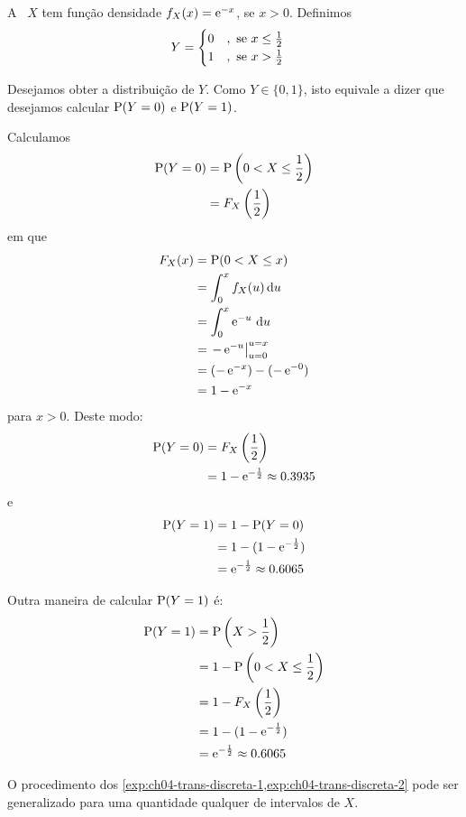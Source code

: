\begin{example}\label{exp:ch04-trans-discreta-2}
    A \va\ $X$ tem função densidade $f_X(x) = \operatorname{e}^{-x}$, se $x > 0$.
    Definimos
    \begin{align*}
        Y &= \begin{cases}
            0 &,\ \text{se } x \le {\textstyle\frac{1}{2}} \\
            1 &,\ \text{se } x > {\textstyle\frac{1}{2}}
        \end{cases}
    \end{align*}

     Desejamos obter a distribuição de $Y$. Como $Y \in \{0, 1\}$,
     isto equivale a dizer que desejamos calcular $\operatorname{P}(Y = 0)$
     e $\operatorname{P}(Y = 1)$.

     Calculamos
    \begin{align*}
        \operatorname{P}(Y = 0) &= \operatorname{P}\left(0 < X \le \frac{1}{2}\right) \\
        &= F_X\left(\frac{1}{2}\right)
    \end{align*}
    em que
    \begin{align*}
        F_X(x) &= \operatorname{P}(0 < X \le x) \\
        &= \int_0^{x} f_X(u)\,\mathrm{d} u \\
        &= \int_0^{x} \operatorname{e}^{-u} \,\mathrm{d} u \\
        &= \left.-\operatorname{e}^{-u}\right|_{u=0}^{u=x} \\
        &= (-\operatorname{e}^{-x}) - (-\operatorname{e}^{-0}) \\
        &= 1 - \operatorname{e}^{-x}
    \end{align*}
    para $x > 0$. Deste modo:
    \begin{align*}
        \operatorname{P}(Y = 0) &= F_X\left(\frac{1}{2}\right) \\
        &= 1 - \operatorname{e}^{-\frac{1}{2}} \approx 0.3935
    \end{align*}
    e
    \begin{align*}
        \operatorname{P}(Y = 1) &= 1 - \operatorname{P}(Y = 0) \\
        &= 1 - (1 - \operatorname{e}^{-\frac{1}{2}}) \\
        &= \operatorname{e}^{-\frac{1}{2}} \approx 0.6065
    \end{align*}

    Outra maneira de calcular $\operatorname{P}(Y = 1)$ é:
    \begin{align*}
        \operatorname{P}(Y = 1) &= \operatorname{P}\left(X > \frac{1}{2}\right) \\
        &= 1 - \operatorname{P}\left(0 < X \le \frac{1}{2}\right) \\
        &= 1 - F_X\left(\frac{1}{2}\right) \\
        &= 1 - (1 - \operatorname{e}^{-\frac{1}{2}}) \\
        &= \operatorname{e}^{-\frac{1}{2}} \approx 0.6065
    \end{align*}
\end{example}

O procedimento dos \cref{exp:ch04-trans-discreta-1,exp:ch04-trans-discreta-2} pode ser generalizado para uma quantidade qualquer
de intervalos de $X$.
